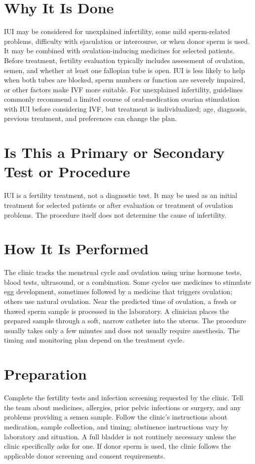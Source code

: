 \section*{Why It Is Done}
IUI may be considered for unexplained infertility, some mild sperm-related problems, difficulty with ejaculation or intercourse, or when donor sperm is used. It may be combined with ovulation-inducing medicines for selected patients. Before treatment, fertility evaluation typically includes assessment of ovulation, semen, and whether at least one fallopian tube is open. IUI is less likely to help when both tubes are blocked, sperm numbers or function are severely impaired, or other factors make IVF more suitable. For unexplained infertility, guidelines commonly recommend a limited course of oral-medication ovarian stimulation with IUI before considering IVF, but treatment is individualized; age, diagnosis, previous treatment, and preferences can change the plan.

\section*{Is This a Primary or Secondary Test or Procedure}
IUI is a fertility treatment, not a diagnostic test. It may be used as an initial treatment for selected patients or after evaluation or treatment of ovulation problems. The procedure itself does not determine the cause of infertility.

\section*{How It Is Performed}
The clinic tracks the menstrual cycle and ovulation using urine hormone tests, blood tests, ultrasound, or a combination. Some cycles use medicines to stimulate egg development, sometimes followed by a medicine that triggers ovulation; others use natural ovulation. Near the predicted time of ovulation, a fresh or thawed sperm sample is processed in the laboratory. A clinician places the prepared sample through a soft, narrow catheter into the uterus. The procedure usually takes only a few minutes and does not usually require anesthesia. The timing and monitoring plan depend on the treatment cycle.

\section*{Preparation}
Complete the fertility tests and infection screening requested by the clinic. Tell the team about medicines, allergies, prior pelvic infections or surgery, and any problems providing a semen sample. Follow the clinic's instructions about medication, sample collection, and timing; abstinence instructions vary by laboratory and situation. A full bladder is not routinely necessary unless the clinic specifically asks for one. If donor sperm is used, the clinic follows the applicable donor screening and consent requirements.

